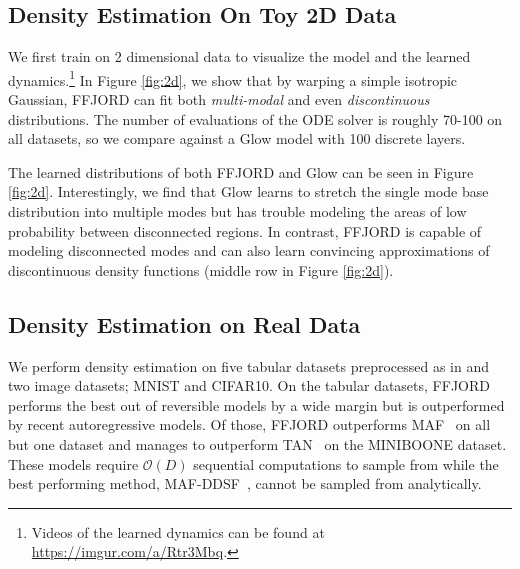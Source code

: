 \documentclass{article} %
\newcommand{\methodname}{FFJORD\xspace}
\newcommand\0{\kern-1.2pt\vec{\kern1.2pt 0}}
\newcommand{\bigO}{\mathcal{O}}
\begin{document}
\subsection{Density Estimation On Toy 2D Data}

We first train on 2 dimensional data to visualize the model and the learned dynamics.\footnote{Videos of the learned dynamics can be found at \href{https://imgur.com/a/Rtr3Mbq}{https://imgur.com/a/Rtr3Mbq}.}
In Figure \ref{fig:2d}, we show that by warping a simple isotropic Gaussian, \methodname can fit both \emph{multi-modal} and even \emph{discontinuous} distributions.
The number of evaluations of the ODE solver is roughly 70-100 on all datasets, so we compare against a Glow model with 100 discrete layers.

The learned distributions of both \methodname and Glow can be seen in Figure \ref{fig:2d}.
Interestingly, we find that Glow learns to stretch the single mode base distribution into multiple modes but has trouble modeling the areas of low probability between disconnected regions.
In contrast, \methodname is capable of modeling disconnected modes and can also learn convincing approximations of discontinuous density functions (middle row in Figure \ref{fig:2d}).

\subsection{Density Estimation on Real Data}
We perform density estimation on five tabular datasets preprocessed as in \citet{papamakarios2017masked} and two image datasets; MNIST and CIFAR10.
On the tabular datasets, \methodname performs the best out of reversible models by a wide margin but is outperformed by recent autoregressive models.
Of those, \methodname outperforms MAF~\citep{papamakarios2017masked} on all but one dataset and manages to outperform TAN~\cite{oliva2018transformation} on the MINIBOONE dataset. 
These models require $\bigO(D)$ sequential computations to sample from while the best performing method, MAF-DDSF~\citep{huang2018neural}, cannot be sampled from analytically. 
\end{document}

